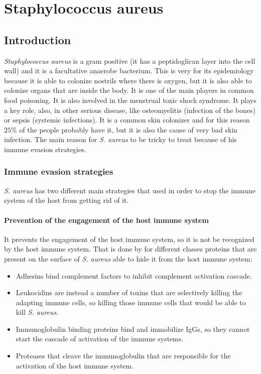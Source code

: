 \graphicspath{{chapters/images/09/}}

\chapter{Staphylococcus aureus}

\section{Introduction}
\emph{Staphylococcus aureus} is a gram positive (it has a peptidoglican layer into the cell wall) and it is a facultative anaerobe bacterium.
This is very for its epidemiology because it is able to colonize nostrils where there is oxygen, but it is also able to colonize organs that are inside the body.
It is  one of the main players in common food poisoning.
It is also involved in the menstrual toxic shock syndrome.
It plays a key role, also, in other serious disease, like osteomyelitis (infection of the bones) or sepsis (systemic infections).
It is a common skin colonizer and for this reason $25\%$ of the people probably have it, but it is also the cause of very bad skin infection.
The main reason for \emph{S. aureus} to be tricky to treat because of his immune evasion strategies.

\subsection{Immune evasion strategies}
\emph{S. aureus} has two different main strategies that used in order to stop the immune system of the host from getting rid of it.

    \subsubsection{Prevention of the engagement of the host immune system}
    It prevents the engagement of the host immune system, so it is not be recognized by the host immune system.
    That is done by for different classes proteins that are present on the  surface of \emph{S. aureus} able to hide it from the host immune system:

    \begin{multicols}{2}
        \begin{itemize}
            \item Adhesins bind complement factors to inhibit complement activation cascade.
            \item Leukocidins are instead a number of toxins that are selectively killing the adapting immune cells, so killing those immune cells that would be able to kill \emph{S. aureus}.
            \item Immunoglobulin binding proteins bind and immobilize IgGs, so they cannot start the cascade of activation of the immune systems.
            \item Proteases that cleave the immunoglobulin that are responsible for the activation of the host immune system.
        \end{itemize}
    \end{multicols}

